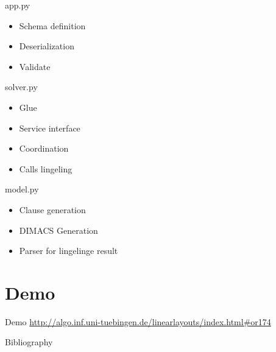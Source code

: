 \documentclass[11pt]{beamer}
\begin{document}
    \begin{frame}{app.py}
        \begin{itemize}
            \item Schema definition
            \item Deserialization
            \item Validate
        \end{itemize}
    \end{frame}

    \begin{frame}{solver.py}
        \begin{itemize}
            \item Glue
            \item Service interface
            \item Coordination
            \item Calls lingeling
        \end{itemize}
    \end{frame}

    \begin{frame}{model.py}
        \begin{itemize}
            \item Clause generation
            \item DIMACS Generation
            \item Parser for lingelinge result
        \end{itemize}
    \end{frame}


    \section{Demo}\label{sec:demo}
    \begin{frame}{Demo}
        \url{http://algo.inf.uni-tuebingen.de/linearlayouts/index.html\#or174}
    \end{frame}

    \begin{frame}{Bibliography}
        
        
    \end{frame}
\end{document}
